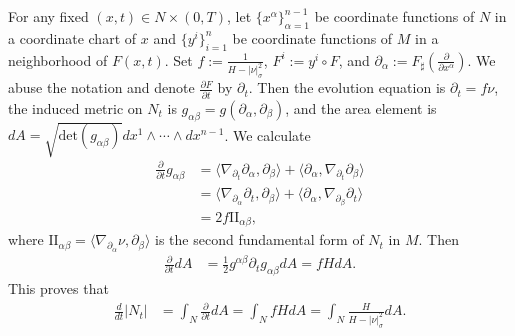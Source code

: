 \documentclass[11pt, letterpaper]{amsart}
\theoremstyle{definition}
\theoremstyle{remark}
\begin{document}
\begin{appendix}
For any fixed $(x,t) \in N \times (0, T)$, let $\{x ^{\alpha }\}_{\alpha =1}^{n-1}$ be coordinate functions of $N$ in a coordinate chart of $x$ and $\{y^{i} \}_{i=1}^{n}$ be coordinate functions of $M$ in a neighborhood of $F(x, t)$. Set $f:= \frac{1}{H-|\nu |^2_{\sigma }}$, $F^{i}:= y ^{i}\circ F$, and $\partial _{\alpha } := F_{ \sharp} (\frac{\partial }{ \partial x ^{\alpha }})$. We abuse the notation and denote $\frac{\partial F}{\partial t}$ by $\partial _t$. Then the evolution equation is $\partial_ t = f \nu $, the induced metric on $N_t$ is $g_{\alpha \beta } = g(\partial _{\alpha }, \partial _{\beta })$, and the area element is $d A = \sqrt{\mathrm{det} (g_{\alpha \beta })} d x^1 \wedge \cdots \wedge d x ^{n-1 }$. We calculate
	\begin{align*}
		\frac{\partial }{\partial t} g_{\alpha  \beta }& = \langle \nabla _{\partial _t} \partial _{\alpha }, \partial _{\beta } \rangle+ \langle \partial _{\alpha }, \nabla _{\partial _t} \partial _{\beta } \rangle \\
						 &= \langle \nabla _{\partial _\alpha }\partial _t , \partial _{\beta } \rangle+ \langle \partial _{\alpha }, \nabla _{\partial _\beta } \partial _t  \rangle\\
						 &= 2f \mathrm{II}_{\alpha \beta } ,
	\end{align*} 
	where $\mathrm{II}_{\alpha  \beta }= \langle \nabla _{\partial _\alpha } \nu , \partial _{\beta } \rangle$ is the second fundamental form of $N_t$ in $M$. Then 	
	\begin{align*}
		\frac{\partial }{\partial t} d A &= \frac{1}{2} g ^{\alpha \beta } \partial _t g_{\alpha \beta } d A = f H d A.
	\end{align*} 
	This proves that 
	\begin{align}
		\frac{d}{d t}|N_t| &= \int_{N} \frac{\partial }{\partial t} d A = \int_{N} f H d A = \int_{N} \frac{H}{H- |\nu |^2_{\sigma }} dA.
	\end{align} 



\end{appendix}
\end{document}
